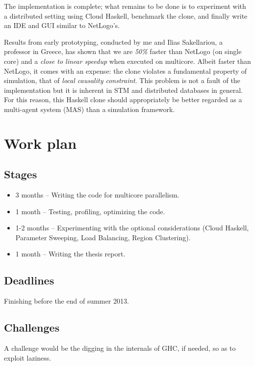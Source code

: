 \documentclass[a4paper]{article}
\begin{document}
The implementation is complete; what remains to be done is to experiment with a distributed setting
using Cloud Haskell, benchmark the clone, and finally write an IDE and GUI similar to NetLogo's.

Results from early prototyping, conducted by me and Ilias Sakellariou, a professor in Greece,
has shown that we are \emph{50\%} faster than NetLogo (on single core) and a \emph{close to linear speedup} when executed on multicore. Albeit faster than NetLogo, it comes with an expense:
the clone violates a fundamental property of simulation, that of \emph{local causality constraint}.
This problem is not a fault of the implementation but it is inherent in STM and
distributed databases in general. For this reason, this Haskell clone should appropriately be
better regarded as a multi-agent system (MAS) than a simulation framework.


\section{Work plan}

\subsection{Stages}

\begin{itemize}
\item 3 months -- Writing the code for multicore parallelism.
\item 1 month -- Testing, profiling, optimizing the code.
\item 1-2 months -- Experimenting with the optional considerations (Cloud Haskell, Parameter Sweeping, Load Balancing, Region Clustering).
\item 1 month -- Writing the thesis report.
\end{itemize}

\subsection{Deadlines}

Finishing before the end of summer 2013.

\subsection{Challenges}

A challenge would be the digging in the internals of GHC, if needed, so as to exploit
laziness.



\end{document}
